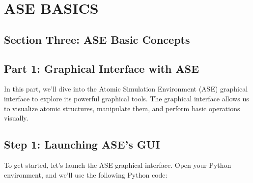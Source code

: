 \documentclass[letterpaper,10pt,english]{sphinxmanual}
\begin{document}
\chapter{ASE BASICS}
\label{\detokenize{asebasics/asebasics:ase-basics}}\label{\detokenize{asebasics/asebasics::doc}}

\section{Section Three: ASE Basic Concepts}
\label{\detokenize{asebasics/asebasics:section-three-ase-basic-concepts}}

\section{Part 1: Graphical Interface with ASE}
\label{\detokenize{asebasics/asebasics:part-1-graphical-interface-with-ase}}
\sphinxAtStartPar
In this part, we’ll dive into the Atomic Simulation Environment (ASE) graphical interface to explore its powerful graphical tools. The graphical interface allows us to visualize atomic structures, manipulate them, and perform basic operations visually.


\section{Step 1: Launching ASE’s GUI}
\label{\detokenize{asebasics/asebasics:step-1-launching-ase-s-gui}}
\sphinxAtStartPar
To get started, let’s launch the ASE graphical interface. Open your Python environment, and we’ll use the following Python code:

\begin{sphinxVerbatim}[commandchars=\\\{\}]
   

   
   \PYG{p}{[}\PYG{p}{[}  \PYG{p}{]} \PYG{p}{[}  \PYG{p}{]}\PYG{p}{]}

\end{sphinxVerbatim}
\end{document}
